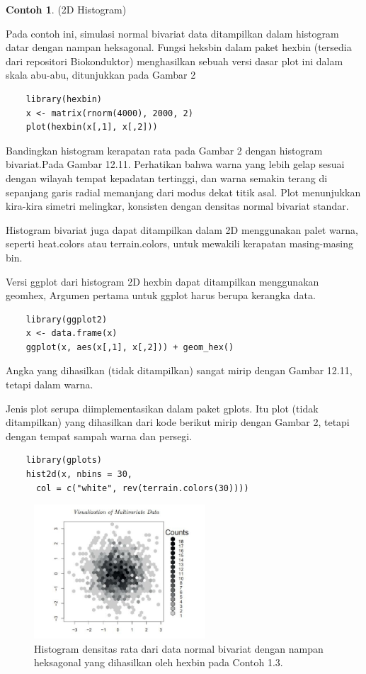 \documentclass[a4paper,12pt]{article}
\theoremstyle{definition}
\newtheorem{example}{Contoh}[section]
\begin{document}
\begin{example} (2D Histogram)

    Pada contoh ini, simulasi normal bivariat data ditampilkan dalam histogram datar dengan nampan heksagonal. Fungsi heksbin dalam paket hexbin (tersedia dari repositori Biokonduktor) menghasilkan sebuah versi dasar plot ini dalam skala abu-abu, ditunjukkan pada Gambar 2

\begin{lstlisting}
    library(hexbin)
    x <- matrix(rnorm(4000), 2000, 2)
    plot(hexbin(x[,1], x[,2]))
\end{lstlisting}

Bandingkan histogram kerapatan rata pada Gambar 2 dengan histogram bivariat.Pada Gambar 12.11. Perhatikan bahwa warna yang lebih gelap sesuai dengan wilayah tempat kepadatan tertinggi, dan warna semakin terang di sepanjang garis radial memanjang dari modus dekat titik asal. Plot menunjukkan kira-kira simetri melingkar, konsisten dengan densitas normal bivariat standar.

Histogram bivariat juga dapat ditampilkan dalam 2D menggunakan palet warna, seperti heat.colors atau terrain.colors, untuk mewakili kerapatan masing-masing bin.

Versi ggplot dari histogram 2D hexbin dapat ditampilkan menggunakan geomhex, Argumen pertama untuk ggplot harus berupa kerangka data.

\begin{lstlisting}
    library(ggplot2)
    x <- data.frame(x)
    ggplot(x, aes(x[,1], x[,2])) + geom_hex()
\end{lstlisting}

Angka yang dihasilkan (tidak ditampilkan) sangat mirip dengan Gambar 12.11, tetapi dalam warna.

Jenis plot serupa diimplementasikan dalam paket gplots. Itu plot (tidak ditampilkan) yang dihasilkan dari kode berikut mirip dengan Gambar 2, tetapi dengan tempat sampah warna dan persegi.

\begin{lstlisting}
    library(gplots)
    hist2d(x, nbins = 30,
      col = c("white", rev(terrain.colors(30))))
\end{lstlisting}

\begin{figure} [H]
    \centering
    \includegraphics[height=5cm]{gb/K3G2.jpg}
    \caption{Histogram densitas rata dari data normal bivariat dengan nampan heksagonal yang dihasilkan oleh hexbin pada Contoh 1.3.}
    \label{fig:my_label}
\end{figure}
\end{example}
\end{document}
